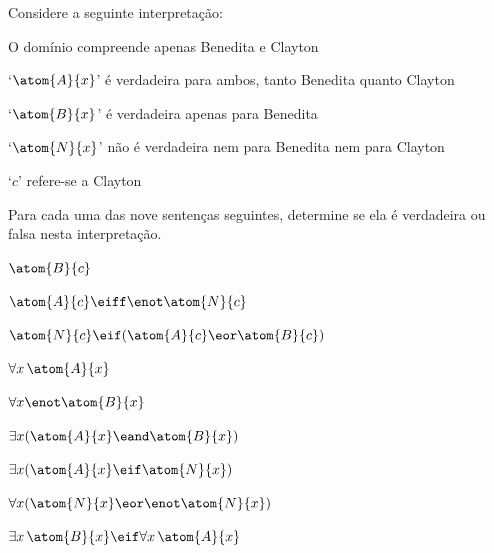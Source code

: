 \practiceproblems
\solutions
\problempart
\label{pr.TorF1}
Considere a seguinte interpretação:
	\begin{ebullet}\small
		\item O domínio compreende apenas Benedita e Clayton
		\item `$\atom{A}{x}$' é verdadeira para ambos, tanto Benedita quanto Clayton
		\item `$\atom{B}{x}$' é verdadeira apenas para Benedita
		\item `$\atom{N}{x}$' não é verdadeira nem para Benedita nem para Clayton
		\item `$c$' refere-se a Clayton
	\end{ebullet}
Para cada uma das nove sentenças seguintes, determine se ela é verdadeira ou falsa nesta interpretação.
\begin{earg}
\item $\atom{B}{c} $
\item $\atom{A}{c}  \eiff \enot \atom{N}{c}$
\item $\atom{N}{c}  \eif (\atom{A}{c} \eor \atom{B}{c})$
\item $\forall x\, \atom{A}{x}$
\item $\forall x \enot \atom{B}{x}$
\item $\exists x(\atom{A}{x} \eand \atom{B}{x})$
\item $\exists x(\atom{A}{x} \eif \atom{N}{x})$
\item $\forall x(\atom{N}{x} \eor \enot \atom{N}{x})$
\item $\exists x\, \atom{B}{x} \eif \forall x\, \atom{A}{x}$
\end{earg}

